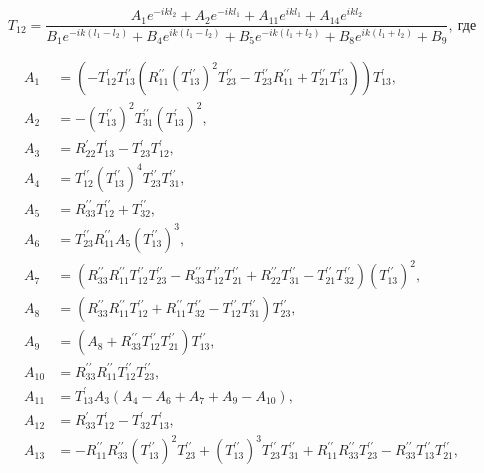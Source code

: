\documentclass[a4 paper, 12 pt]{extarticle}
\begin{document}
   
  \begin{equation}
   \label{T12}
   T_{12} = \frac {A_1 e^{-ikl_2} + A_2 e^{-ikl_1} + A_{11} e^{ikl_1} + A_{14} e^{ikl_2}}
   {B_1 e^{-ik\left(l_1-l_2\right)} + B_4 e^{ik\left(l_1-l_2\right)} + B_5 e^{-ik\left(l_1+l_2\right)} + B_8 e^{ik\left(l_1+l_2\right)} + B_9}, \ \text{где}
  \end{equation}
   
   \[
   \begin{aligned}
   A_1 &= \left(-T_{12}^\prime T_{13}^{\prime\prime} \left(R_{11}^{\prime\prime} (T_{13}^{\prime\prime})^2 T_{23}^{\prime\prime} - T_{23}^{\prime\prime} R_{11}^{\prime\prime} + T_{21}^{\prime\prime} T_{13}^{\prime\prime} \right)\right) T_{13}^\prime, \\
   A_2 &= -(T_{13}^{\prime\prime})^2 T_{31}^{\prime\prime} (T_{13}^\prime)^2, \\
   A_3 &= R_{22}^\prime T_{13}^\prime - T_{23}^\prime T_{12}^\prime, \\
   A_4 &= T_{12}^{\prime\prime} (T_{13}^{\prime\prime})^4 T_{23}^{\prime\prime} T_{31}^{\prime\prime}, \\
   A_5 &= R_{33}^{\prime\prime} T_{12}^{\prime\prime} + T_{32}^{\prime\prime}, \\
   A_6 &= T_{23}^{\prime\prime} R_{11}^{\prime\prime} A_5 (T_{13}^{\prime\prime})^3, \\
   A_7 &= \left(R_{33}^{\prime\prime} R_{11}^{\prime\prime} T_{12}^{\prime\prime} T_{23}^{\prime\prime} - R_{33}^{\prime\prime} T_{12}^{\prime\prime} T_{21}^{\prime\prime} + R_{22}^{\prime\prime} T_{31}^{\prime\prime} - T_{21}^{\prime\prime} T_{32}^{\prime\prime}\right)\left(T_{13}^{\prime\prime}\right)^2, \\
   A_8 &= (R_{33}^{\prime\prime} R_{11}^{\prime\prime} T_{12}^{\prime\prime} + R_{11}^{\prime\prime} T_{32}^{\prime\prime} - T_{12}^{\prime\prime} T_{31}^{\prime\prime}) T_{23}^{\prime\prime}, \\
   A_9 &= (A_8 + R_{33}^{\prime\prime} T_{12}^{\prime\prime} T_{21}^{\prime\prime} ) T_{13}^{\prime\prime}, \\
   A_{10} &= R_{33}^{\prime\prime} R_{11}^{\prime\prime} T_{12}^{\prime\prime} T_{23}^{\prime\prime}, \\
   A_{11} &= T_{13}^\prime A_3(A_4-A_6+A_7+A_9-A_{10}), \\
   A_{12} &= R_{33}^\prime T_{12}^\prime - T_{32}^\prime T_{13}^\prime, \\
   A_{13} &= -R_{11}^{\prime\prime} R_{33}^{\prime\prime} (T_{13}^{\prime\prime})^2 T_{23}^{\prime\prime} + (T_{13}^{\prime\prime})^3 T_{23}^{\prime\prime} T_{31}^{\prime\prime} + R_{11}^{\prime\prime} R_{33}^{\prime\prime} T_{23}^{\prime\prime}  - R_{33}^{\prime\prime} T_{13}^{\prime\prime} T_{21}^{\prime\prime}, \\

\end{aligned}\]
\end{document}
